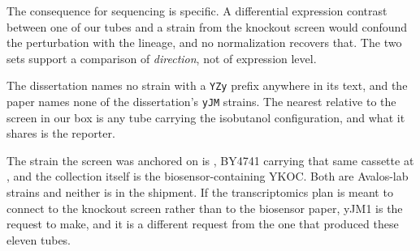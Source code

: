The consequence for sequencing is specific. A differential expression contrast
between one of our tubes and a strain from the knockout screen would confound
the perturbation with the lineage, and no normalization recovers that. The two
sets support a comparison of \emph{direction}, not of expression level.

 The dissertation names
no strain with a \texttt{YZy} prefix anywhere in its text, and the paper names
none of the dissertation's \texttt{yJM} strains. The nearest relative to the
screen in our box is any tube carrying the isobutanol configuration, and what it
shares is the reporter.

 The strain the
screen was anchored on is , BY4741 carrying that same cassette at
, and the collection itself is the biosensor-containing YKOC. Both
are Avalos-lab strains and neither is in the shipment. If the transcriptomics
plan is meant to connect to the knockout screen rather than to the biosensor
paper, yJM1 is the request to make, and it is a different request from the one
that produced these eleven tubes.

